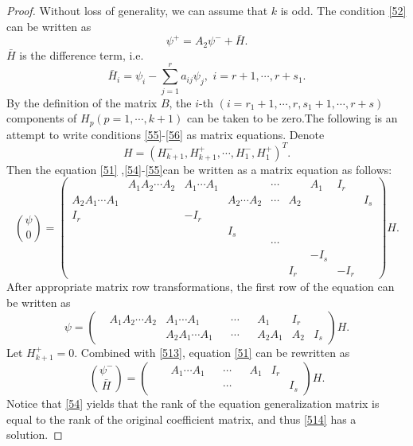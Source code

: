 \documentclass[a4paper,reqno,11pt]{amsart}
\numberwithin{equation}{section} %
\begin{document}
\begin{proof}
	Without loss of generality, we can assume that $k$ is odd. The condition \ref{52} can be written as
\begin{equation}\label{513}
	\psi^{+}=A_2\psi ^{-}+\bar{H} .
\end{equation}
$\bar{H}$  is the difference term, i.e.
\begin{equation}
    \bar{H}_i =\psi _i- \sum_{j=1}^r{a_{ij}\psi _j,\,\,i=r+1,\cdots ,r+s_1}.
\end{equation}
By the definition of the matrix $B$, the $i$-th $(i=r_1+1,\cdots,r,s_1+1,\cdots,r+s)$ components of $H_p(p = 1, \cdots , k+1)$ can be taken to be zero.The following is an attempt to write conditions \eqref{55}-\eqref{56} as matrix equations. Denote
$$
H=\left( H^{-}_{k+1},H^{+}_{k+1},\cdots ,H^{-}_{1},H^{+}_{1} \right) ^T .
$$
Then the equation \eqref{51} ,\eqref{54}-\eqref{55}can be written as a matrix equation as follows:
$$
\binom{\psi}{0} = \left( \begin{matrix}
   & A_1A_2\cdots A_2&		A_1\cdots A_1&	&	\cdots&		&A_1 & I _r&		\\
    A_2A_1\cdots A_1&	&	&A_2\cdots A_2&		\cdots&		A_2&	&	&I_s\\
    I_r& &-I_r &  & & & & & \\
    & & & I_s & & & & &\\
    & & &  & \cdots& & & &\\
    & & &  & & & -I_s& &\\
    & & &  & &I_r & & -I_r& 
\end{matrix} \right) H.
$$
After appropriate matrix row transformations, the first row of the equation can be written as
$$
\psi = \left( \begin{matrix}
  &  A_1A_2\cdots A_2&		A_1\cdots A_1&	&	\cdots&	&	A_1&	I_r&	\\
   & &  A_2A_1\cdots A_1&	&	\cdots&		&	A_2A_1 &	A_2 &	I_s
\end{matrix} \right) H.
$$
Let $H^{+}_{k+1}=0$. Combined with \eqref{513}, equation \eqref{51} can be rewritten as
\begin{equation}\label{514}
	\binom{\psi ^{-}}{\bar{H} } =\left( \begin{matrix}
		&  &		A_1\cdots A_1&	&	\cdots&	&	A_1&	I_r&	\\
		 & &  &	&	\cdots&	&	 & &	I_s
	  \end{matrix} \right) H.
\end{equation}
Notice that \eqref{54} yields that the rank of the equation generalization matrix is equal to the rank of the original coefficient matrix, and thus \eqref{514} has a solution.
\end{proof}
\end{document}
